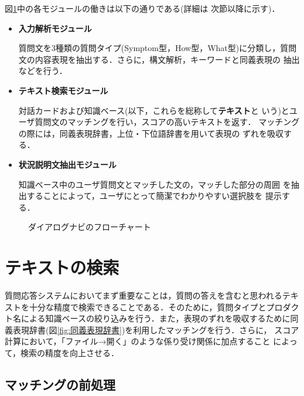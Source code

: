 図\ref{fig:architecture}中の各モジュールの働きは以下の通りである(詳細は
次節以降に示す)．

\begin{itemize}
 \item {\bf 入力解析モジュール}

       質問文を3種類の質問タイプ(Symptom型，How型，What型)に分類し，質問
       文の内容表現を抽出する．さらに，構文解析，キーワードと同義表現の
       抽出などを行う．

 \item {\bf テキスト検索モジュール}

       対話カードおよび知識ベース(以下，これらを総称して{\bf テキスト}と
       いう)とユーザ質問文のマッチングを行い，スコアの高いテキストを返す．
       マッチングの際には，同義表現辞書，上位・下位語辞書を用いて表現の
       ずれを吸収する．

 \item {\bf 状況説明文抽出モジュール}

       知識ベース中のユーザ質問文とマッチした文の，マッチした部分の周囲
       を抽出することによって，ユーザにとって簡潔でわかりやすい選択肢を
       提示する．

\end{itemize}


\begin{figure}
 \begin{center}
  \caption{ダイアログナビのフローチャート} \label{fig:architecture}
 \end{center}
\end{figure}



\section{テキストの検索} \label{sec:テキストの検索}

質問応答システムにおいてまず重要なことは，質問の答えを含むと思われるテキ
ストを十分な精度で検索できることである．そのために，質問タイプとプロダク
ト名による知識ベースの絞り込みを行う．また，表現のずれを吸収するために同
義表現辞書(図\ref{fig:同義表現辞書})を利用したマッチングを行う．さらに，
スコア計算において，「ファイル→開く」のような係り受け関係に加点すること
によって，検索の精度を向上させる\cite{CLARIT}．


\subsection{マッチングの前処理} \label{subsec:マッチングにおける文節の扱い}

